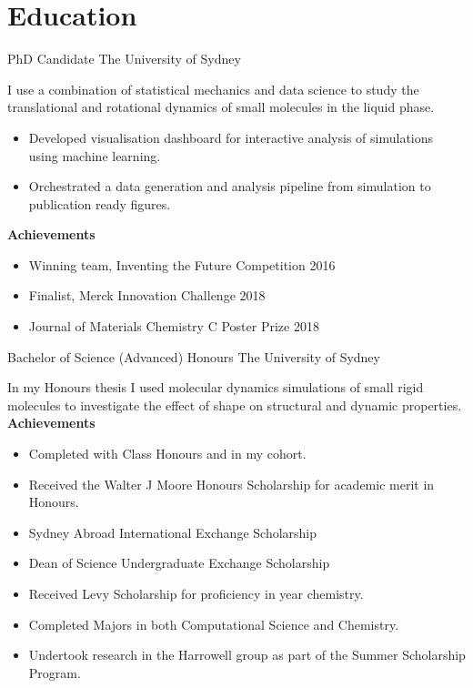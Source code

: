 



\makecvtitle{}

\vspace{-4em}
\section{Education}

{PhD Candidate}
{The University of Sydney}{}{}
{%
  I use a combination of statistical mechanics and data science to
  study the translational and rotational dynamics
  of small molecules in the liquid phase.
\begin{itemize}
  \item Developed visualisation dashboard for interactive analysis of simulations
    using machine learning.
  \item Orchestrated a data generation and analysis pipeline from simulation to
    publication ready figures.
\end{itemize}
\textbf{Achievements}
\begin{itemize}
  \item Winning team, Inventing the Future Competition 2016
  \item Finalist, Merck Innovation Challenge 2018
  \item Journal of Materials Chemistry C Poster Prize 2018
\end{itemize}
}
\vspace{1em}

{Bachelor of Science (Advanced) Honours}
{The University of Sydney}{}{}
{%
  In my Honours thesis
  I used molecular dynamics simulations of small rigid molecules
  to investigate the effect of shape on structural and dynamic properties.
\textbf{Achievements}
\begin{itemize}
  \item Completed with  Class Honours and  in my cohort.
  \item Received the Walter J Moore Honours Scholarship for academic merit in Honours.
  \item Sydney Abroad International Exchange Scholarship
  \item Dean of Science Undergraduate Exchange Scholarship
  \item Received Levy Scholarship for proficiency in  year chemistry.
  \item Completed Majors in both Computational Science and Chemistry.
  \item Undertook research in the Harrowell group as part of the Summer Scholarship Program.
\end{itemize}
}
\vspace{1em}

